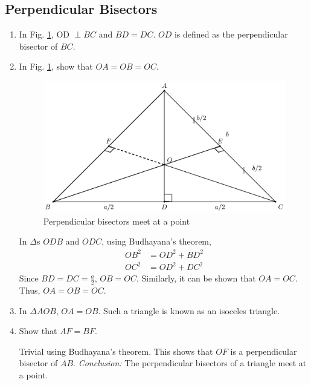 \subsection{Perpendicular Bisectors}
\renewcommand{\theequation}{\theenumi}
\begin{enumerate}[label=\arabic*.,ref=\thesubsection.\theenumi]

\item
	In Fig. \ref{ch3_perp_bisector}, OD $\perp BC$ and $BD=DC$. $OD$ is defined as the perpendicular bisector of $BC$.


\item
	In Fig. \ref{ch3_perp_bisector}, show that $OA=OB=OC$.

\begin{figure}[!ht]
	\begin{center}
		
		\includegraphics[width=\columnwidth]{./figs/fig_3.8.eps}
	\end{center}
	\caption{Perpendicular bisectors meet at a point}
	\label{ch3_perp_bisector}	
\end{figure}
%
\solution In $\Delta$s $ODB$ and $ODC$, using Budhayana's theorem,
%
\begin{equation}
\begin{split}
OB^2 &= OD^2 + BD^2 \\
OC^2 &= OD^2 + DC^2 
\end{split}
\end{equation}
%
Since $BD = DC = \frac{a}{2}$, $OB = OC$.  Similarly, it can be shown that $OA = OC$.  Thus, $OA=OB=OC$.
%
\item
	In $\Delta AOB$, $OA = OB$.  Such a triangle is known as an isoceles triangle.

%
\item
	Show that $AF = BF$.

\solution Trivial using Budhayana's theorem.  This shows that $OF$ is a perpendicular bisector of $AB$. 
{\em Conclusion:}  The perpendicular bisectors of a triangle meet at a point.
%
\end{enumerate}

